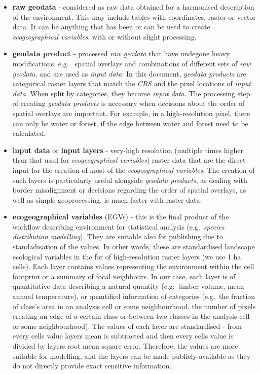\documentclass[
]{book}
\begin{document}
\begin{itemize}
\item
  \textbf{raw geodata} - considered as raw data obtained for a harmonised description
  of the environment. This may include tables with coordinates, raster or vector data.
  It can be anything that has been or can be used to create \emph{ecogeographical variables},
  with or without slight processing.
\item
  \textbf{geodata product} - processed \emph{raw geodata} that have undegone heavy modifications, e.g.~
  spatial overlays and combinations of different sets of \emph{raw geodata}, and are used
  as \emph{input data}. In this document, \emph{geodata products} are categorical
  raster layers that match the \emph{CRS} and the pixel locations of \emph{input data}. When
  split by categories, they become \emph{input data}. The processing step of creating \emph{geodata products}
  is necessary when decisions about the order of spatial overlays are important. For example,
  in a high-resolution pixel, there can only be water or forest, if the edge between water and
  forest need to be calculated.
\item
  \textbf{input data} or \textbf{input layers} - very-high resolution (multiple times higher than that
  used for \emph{ecogeographical variables}) raster data that are the direct input for the creation
  of most of the \emph{ecogeographical variables}. The creation of such layers is particularly useful
  alongside \emph{geodata products}, as dealing with border misalignment or decisions regarding the
  order of spatial overlays, as well as simple geoprocessing, is much faster with raster
  data.
\item
  \textbf{ecogeographical variables} (EGVs) - this is the final product of the workflow
  describing environment for statistical analysis (e.g.~\emph{species distribution modelling}).
  They are suitable also for publishing due to standadisation of the values. In other
  words, these are standardised landscape ecological variables in the for of
  high-resolution raster layers (we use 1 ha cells). Each layer contains values
  representing the environment within the cell footprint or a summary of focal
  neighbours. In our case, each layer is of quantitative data describing a natural
  quantity (e.g.~timber volume, mean annual temperature), or quantified information of
  categories (e.g.~the fraction of class's area in an analysis cell or some neighbourhood,
  the number of pixels creating an edge of a certain class or between two classes in the
  analysis cell or some neighbourhood). The values of each layer are standardised - from
  every cells value layers mean is subtracted and then every cells value is divided
  by layers root mean square error. Therefore, the values are more suitable for
  modelling, and the layers can be made publicly available as they do not directly
  provide exact sensitive information.
\end{itemize}
\end{document}
